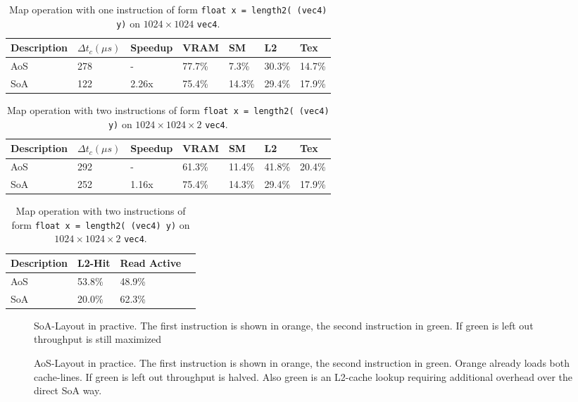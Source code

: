 \documentclass[m,times]{cgMA}
\begin{document}
\begin{table}
  \begin{tabular}{ | l | l | l | l | l | l | l |}    \hline
    Description &  $\Delta t_c (\mu s)$ & Speedup &VRAM     & SM     & L2     & Tex \\\hline
    AoS         & 278                   & -       &77.7\%   & 7.3\%  & 30.3\% & 14.7\% \\\hline
    SoA         & 122                   & 2.26x   &75.4\%   & 14.3\% & 29.4\% & 17.9\% \\
    \hline
  \end{tabular}
  \caption{Map operation with one instruction of form \texttt{float x = length2( (vec4) y)} on $1024 \times 1024$ \texttt{vec4}.}\label{table:map_1}
\end{table}

\begin{table}
  \begin{tabular}{ | l | l | l | l | l | l | l |}    \hline
    Description &  $\Delta t_c (\mu s)$ & Speedup &VRAM   & SM     & L2     & Tex \\\hline
    AoS         & 292                   & -       &61.3\% & 11.4\% & 41.8\% & 20.4\% \\\hline
    SoA         & 252                   & 1.16x   &75.4\% & 14.3\% & 29.4\% & 17.9\% \\
    \hline
  \end{tabular}
  \begin{tabular}{ | l | l | l | l | }    \hline
    Description &  L2-Hit & Read Active \\\hline
    AoS   & 53.8\%        & 48.9\%      \\\hline
    SoA   & 20.0\%          & 62.3\%      \\
    \hline
  \end{tabular}
  \caption{Map operation with two instructions of form \texttt{float x = length2( (vec4) y)} on $1024 \times 1024 \times 2$ \texttt{vec4}.}\label{table:map_2}
\end{table}

\begin{figure}[htbp]
  \centering
  
  \caption{SoA-Layout in practive. The first instruction is shown in orange, the second instruction in green. If green is left out throughput is still maximized}
\end{figure}
\begin{figure}[htbp]
  \centering
  
  \caption{AoS-Layout in practice. The first instruction is shown in orange, the second instruction in green. Orange already loads both cache-lines. If green is left out throughput is halved. Also green is an L2-cache lookup requiring additional overhead over the direct SoA way.}
\end{figure}
\end{document}
